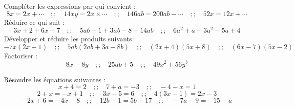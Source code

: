 \documentclass[a4paper,addpoints,12pt]{exam}
\begin{document}
\devoir[prv=false,ds=false,num=4 ,niv=1 ,date=12/02/2023,Rdate=19/02/2023, sem=2]

\begin{exo}
\begin{questions}
\question Compléter les expressions par qui convient :
\[
 8x = 2x + \cdots\quad ;; \quad
 14xy = 2x \times \cdots\quad ;; \quad
 146 ab = 200 ab - \cdots\quad ;; \quad
 52 x = 12 x + \cdots
\]
\question Réduire ce qui suit :
\[
3x+2+6x-7\quad ;; \quad
5ab-1+3ab-8-14ab\quad ;; \quad
6a^{2}+a-3a^{2}-5a+4
\]
\question Développer et réduire les produits suivants:
\[
-7x(2x+1)\quad ;; \quad
5ab(2ab+3a-8b)\quad ;; \quad
(2x+4)(5x+8)\quad ;; \quad
(6x-7)(5x-2)
\]
\question Factoriser :
\[
8x-8y\quad ;; \quad
25ab+5\quad ;; \quad
49x^{2}+56y^{3}
\]
\end{questions}
\end{exo}

\begin{exo}
Résoudre les équations suivantes :
\[
x+4=2\quad ;; \quad
7+a=-3\quad ;; \quad
-4-x=1
\]
\[
2+x=-x+1\quad ;; \quad
3x-5=6\quad ;; \quad
4(3x-1)=2x-3
\]
\[
-2x+6=-4x-8\quad ;; \quad
12b-1=5b-17\quad ;; \quad
-7a-9=-15-a
\]
\end{exo}
\begin{exo}
\end{exo}
\end{document}
